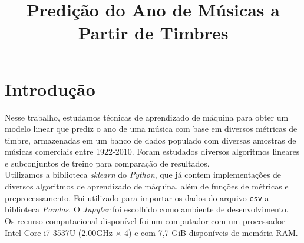 \documentclass[conference]{IEEEtran}
\begin{document}
\title{Predição do Ano de Músicas a Partir de Timbres}

\author{
\and
{}
}

\maketitle

\section{Introdução}

Nesse trabalho, estudamos técnicas de aprendizado de máquina para obter um modelo linear que prediz o ano de uma música com base em diversos métricas de timbre, armazenadas em um banco de dados populado com diversas amostras de músicas comerciais entre 1922-2010. Foram estudados diversos algoritmos lineares e subconjuntos de treino para comparação de resultados.\\
Utilizamos a biblioteca \textit{sklearn}\cite{b1} do \textit{Python}, que já contem implementações de diversos algoritmos de aprendizado de máquina, além de funções de métricas e preprocessamento. Foi utilizado para importar os dados do arquivo \texttt{csv} a biblioteca \textit{Pandas}. O \textit{Jupyter} foi escolhido como ambiente de desenvolvimento.\\
Os recurso computacional disponível foi um computador com um processador Intel Core i7-3537U (2.00GHz × 4) e com 7,7 GiB disponíveis de memória RAM.

%
\end{document}

